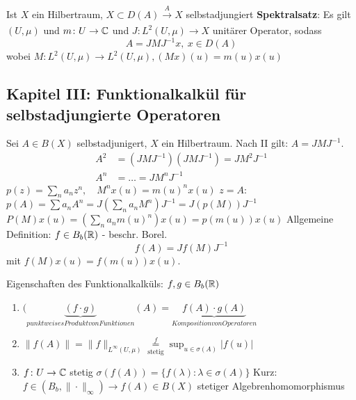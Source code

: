 Ist $X$ ein Hilbertraum, $X \subset D(A) \xrightarrow[]{A} X$ selbstadjungiert
\textbf{Spektralsatz}: Es gilt $(U, \mu)$ und $m \colon U \rightarrow \mathbb{C}$ und $J \colon L^{2}(U, \mu) \rightarrow X$ unitärer Operator, sodass
	\[ A = J M J^{-1} x, ~ x \in D(A) \]
	wobei $M \colon L^{2}(U, \mu) \rightarrow L^{2}(U, \mu), (M x)(u) = m(u)x(u)$


\subsection*{Kapitel III: Funktionalkalkül für selbstadjungierte Operatoren}

 Sei $A \in B(X)$ selbstadjunigert, $X$ ein Hilbertraum. Nach II gilt: $A = J M J^{-1}$.
 \begin{align*}
 	A^{2} & = (J M J^{-1})(J M J^{-1}) = J M^{2} J^{-1} \\
	A^{n} & = \dotsc  = J M^{n} J^{-1} 
 \end{align*}
 $p(z) = \sum_{n} a_{n} z^{n}, \quad M^{n} x(u) = m(u)^{n} x(u)$
 $z = A$: $p(A) = \sum a_{n} A^{n} = J (\sum_{n} a_{n} M^{n} ) J^{-1} = J ( p(M) ) J^{-1}$
 $P(M)x(u) = ( \sum_{n} a_{n} m(u)^{n} ) x(u) = p(m(u)) x(u)$
 Allgemeine Definition: $f \in B_{b}(\mathbb{R})$ - beschr. Borel.
 	\[ f(A) = J f(M) J^{-1} \]
 mit $f(M) x(u) = f(m(u)) x(u)$.
 
 Eigenschaften des Funktionalkalküls: $f, g \in B_{b}(\mathbb{R})$
 \begin{enumerate}[label=\roman*\upshape)]
 	\item $(\underbrace{(f \cdot g)}_{punktweises Produkt von Funktionen}(A) = \underbrace{f(A) \cdot g(A)}_{Komposition von Operatoren}$
 	\item $\| f(A) \| = \| f \|_{L^{\infty}(U, \mu)} \underset{\text{stetig}}{\overset{f}{=}} \sup_{u \in \sigma(A)} |f(u) |$
 	\item $f \colon U \rightarrow \mathbb{C}$ stetig
 		$\sigma( f(A) ) = \{ f(\lambda) : \lambda \in \sigma(A) \}$
 		Kurz: $f \in (B_{b}, \| \cdot \|_{\infty} ) \rightarrow f(A) \in B(X)$ stetiger Algebrenhomomorphismus
 \end{enumerate}
 

